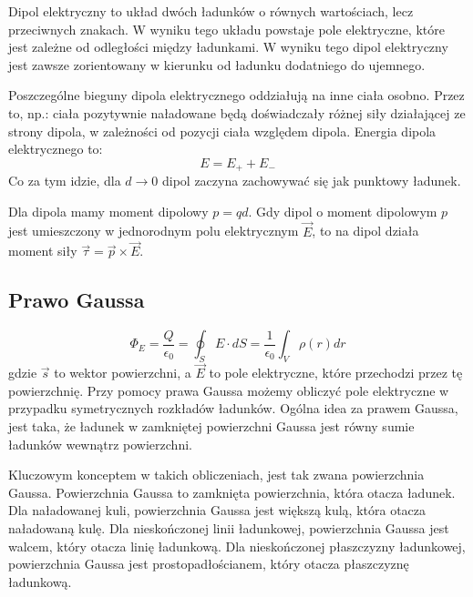 \documentclass{../notatki}
\begin{document}
Dipol elektryczny to układ dwóch ładunków o równych wartościach, lecz
przeciwnych znakach. W wyniku tego układu powstaje pole elektryczne, które
jest zależne od odległości między ładunkami. W wyniku tego dipol elektryczny
jest zawsze zorientowany w kierunku od ładunku dodatniego do ujemnego.
\begin{figure}[h]
  \centering
\end{figure}

Poszczególne bieguny dipola elektrycznego oddziałują na inne ciała osobno.
Przez to, np.: ciała pozytywnie naładowane będą doświadczały różnej siły
działającej ze strony dipola, w zależności od pozycji ciała względem dipola.
Energia dipola elektrycznego to:
$$
E = E_+ + E_-
$$
Co za tym idzie, dla $d \rightarrow 0$ dipol zaczyna zachowywać się jak
punktowy ładunek.

Dla dipola mamy moment dipolowy $p = qd$. Gdy dipol o moment dipolowym $p$ jest
umieszczony w jednorodnym polu elektrycznym $\vec{E}$, to na dipol działa moment
siły $\vec{\tau} = \vec{p} \times \vec{E}$.

\subsection{Prawo Gaussa}

$$
\Phi_E = \frac{Q}{\epsilon_0} = \oint_S E \cdot dS = \frac{1}{\epsilon_0}
\int_V \rho(r) dr
$$
gdzie $\vec{s}$ to wektor powierzchni, a $\vec{E}$ to pole elektryczne, które
przechodzi przez tę powierzchnię. Przy pomocy prawa Gaussa możemy
obliczyć pole elektryczne w przypadku symetrycznych rozkładów ładunków.
Ogólna idea za prawem Gaussa, jest taka, że ładunek w zamkniętej powierzchni
Gaussa jest równy sumie ładunków wewnątrz powierzchni.

Kluczowym konceptem w takich obliczeniach, jest tak zwana powierzchnia
Gaussa. Powierzchnia Gaussa to zamknięta powierzchnia, która otacza
ładunek. Dla naładowanej kuli, powierzchnia Gaussa jest większą kulą, która
otacza naładowaną kulę. Dla nieskończonej linii ładunkowej, powierzchnia Gaussa
jest walcem, który otacza linię ładunkową. Dla nieskończonej płaszczyzny
ładunkowej, powierzchnia Gaussa jest prostopadłościanem, który otacza
płaszczyznę ładunkową.
\end{document}
